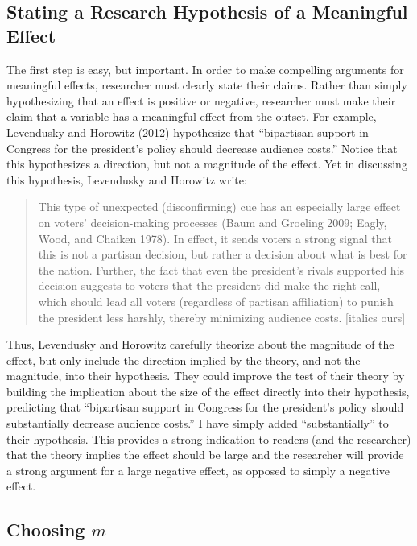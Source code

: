 \documentclass[12pt]{article}
\begin{document}
\subsection*{Stating a Research Hypothesis of a Meaningful Effect}

The first step is easy, but important. In order to make compelling arguments for meaningful effects, researcher must clearly state their claims. Rather than simply hypothesizing that an effect is positive or negative, researcher must make their claim that a variable has a meaningful effect from the outset. For example, Levendusky and Horowitz (2012) hypothesize that ``bipartisan support in Congress for the president's policy should decrease audience costs.'' Notice that this hypothesizes a direction, but not a magnitude of the effect. Yet in discussing this hypothesis, Levendusky and Horowitz write: 

\begin{quote}
This type of unexpected (disconfirming) cue has an especially large effect on voters' decision-making processes (Baum and Groeling 2009; Eagly, Wood, and Chaiken 1978). In effect, it sends voters a strong signal that this is not a partisan decision, but rather a decision about what is best for the nation. Further, the fact that even the president's rivals supported his decision suggests to voters that the president did make the right call, which should lead all voters (regardless of partisan affiliation) to punish the president less harshly, thereby minimizing audience costs. [italics ours]
\end{quote}

Thus, Levendusky and Horowitz carefully theorize about the magnitude of the effect, but only include the direction implied by the theory, and not the magnitude, into their hypothesis. They could improve the test of their theory by building the implication about the size of the effect directly into their hypothesis, predicting that ``bipartisan support in Congress for the president's policy should substantially decrease audience costs.'' I have simply added ``substantially'' to their hypothesis. This provides a strong indication to readers (and the researcher) that the theory implies the effect should be large and the researcher will provide a strong argument for a large negative effect, as opposed to simply a negative effect. 

\subsection*{Choosing $m$}
\end{document}
